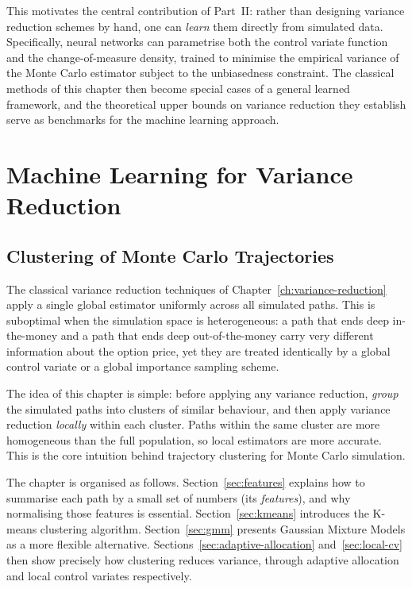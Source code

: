 \documentclass[12pt, a4paper]{report}
\theoremstyle{definition}
\begin{document}
This motivates the central contribution of Part~II: rather than
designing variance reduction schemes by hand, one can \emph{learn} them
directly from simulated data.  Specifically, neural networks can
parametrise both the control variate function and the change-of-measure
density, trained to minimise the empirical variance of the Monte Carlo
estimator subject to the unbiasedness constraint.  The classical methods
of this chapter then become special cases of a general learned framework,
and the theoretical upper bounds on variance reduction they establish
serve as benchmarks for the machine learning approach.

\part{Machine Learning for Variance Reduction}

\chapter{Clustering of Monte Carlo Trajectories}
\label{ch:clustering}

The classical variance reduction techniques of
Chapter~\ref{ch:variance-reduction} apply a single global estimator
uniformly across all simulated paths.  This is suboptimal when the
simulation space is heterogeneous: a path that ends deep in-the-money
and a path that ends deep out-of-the-money carry very different
information about the option price, yet they are treated identically by
a global control variate or a global importance sampling scheme.

The idea of this chapter is simple: before applying any variance
reduction, \emph{group} the simulated paths into clusters of similar
behaviour, and then apply variance reduction \emph{locally} within each
cluster.  Paths within the same cluster are more homogeneous than the
full population, so local estimators are more accurate.  This is the
core intuition behind trajectory clustering for Monte Carlo simulation.

The chapter is organised as follows.  Section~\ref{sec:features}
explains how to summarise each path by a small set of numbers (its
\emph{features}), and why normalising those features is essential.
Section~\ref{sec:kmeans} introduces the K-means clustering algorithm.
Section~\ref{sec:gmm} presents Gaussian Mixture Models as a more
flexible alternative.  Sections~\ref{sec:adaptive-allocation}
and~\ref{sec:local-cv} then show precisely how clustering reduces
variance, through adaptive allocation and local control variates
respectively.
\end{document}
